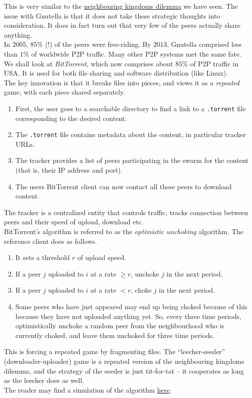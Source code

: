 		This is very similar to the \href{ex: neighbouring kingdom dilemma}{neighbouring kingdoms dilemma} we have seen. The issue with Gnutella is that it does not take these strategic thoughts into consideration. It does in fact turn out \cite{gnutella-free-ride} that very few of the peers actually share anything.\\
		In 2005, $85\%$ (!) of the peers were free-riding. By $2013$, Gnutella comprised less than $1\%$ of worldwide P2P traffic. Many other P2P systems met the same fate.\\

		We shall look at \emph{BitTorrent}, which now comprises about $85\%$ of P2P traffic in USA. It is used for both file sharing and software distribution (like Linux).\\
		The key innovation is that it breaks files into pieces, and views it as a \emph{repeated} game, with each piece shared separately.
		\begin{enumerate}
			\item First, the user goes to a searchable directory to find a link to a \texttt{.torrent} file corresponding to the desired content.
			\item The \texttt{.torrent} file contains metadata about the content, in particular tracker URLs.
			\item The tracker provides a list of peers participating in the swarm for the content (that is, their IP address and port).
			\item The users BitTorrent client can now contact all these peers to download content.
		\end{enumerate}
		The tracker is a centralized entity that controls traffic, tracks connection between peers and their speed of upload, download etc.\\
		BitTorrent's algorithm is referred to as the \emph{optimistic unchoking} algorithm. The reference client does as follows.
		\begin{enumerate}
			\item It sets a threshold $r$ of upload speed. %
			\item If a peer $j$ uploaded to $i$ at a rate $\ge r$, unchoke $j$ in the next period.
			\item If a peer $j$ uploaded to $i$ at a rate $< r$, choke $j$ in the next period.
			\item Some peers who have just appeared may end up being choked because of this because they have not uploaded anything yet. So, every three time periods, optimistically unchoke a random peer from the neighbourhood who is currently choked, and leave them unchoked for three time periods.
		\end{enumerate}
		This is forcing a repeated game by fragmenting files. The ``leecher-seeder'' (downloader-uploader) game is a repeated version of the neighbouring kingdoms dilemma, and the strategy of the seeder is just tit-for-tat -- it cooperates as long as the leecher does as well.\\
		The reader may find a simulation of the algorithm \href{http://mg8.org/processing/bt.html}{here}.\\

